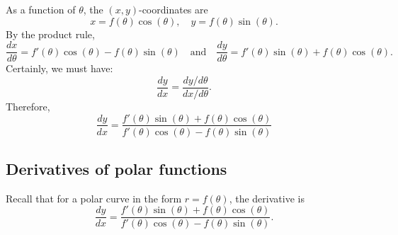 \documentclass[10pt]{article}
\theoremstyle{definition}
\newcommand{\1}[1]{\textbf{1}_{\left[#1\right]}} %
\begin{document}
As a function of $\theta$, the $(x,y)$-coordinates are
\begin{equation*}
  x=f(\theta)\cos(\theta), \quad y = f(\theta)\sin(\theta).
\end{equation*}
By the product rule,
\begin{equation*}
  \frac{dx}{d\theta} = f'(\theta)\cos(\theta)-f(\theta)\sin(\theta) \quad \text{and} \quad  \frac{dy}{d\theta} = f'(\theta)\sin(\theta) + f(\theta)\cos(\theta).
\end{equation*}
Certainly, we must have:
\begin{equation*}
  \frac{dy}{dx} = \frac{dy/d\theta}{dx/d\theta}.
\end{equation*}
Therefore,
\begin{equation*}
  \boxed{
    \frac{dy}{dx} = \frac{f'(\theta)\sin(\theta) + f(\theta)\cos(\theta)}{f'(\theta)\cos(\theta)-f(\theta)\sin(\theta)}
  }
\end{equation*}


\subsection{Derivatives of polar functions}
Recall that for a polar curve in the form $r = f(\theta)$, the derivative is
\begin{equation}\label{eq:derivative-of-polar-curve}
  \boxed{
    \frac{dy}{dx} = \frac{f'(\theta)\sin(\theta) + f(\theta)\cos(\theta)}{f'(\theta)\cos(\theta)-f(\theta)\sin(\theta)}.
  }
\end{equation}
\end{document}
